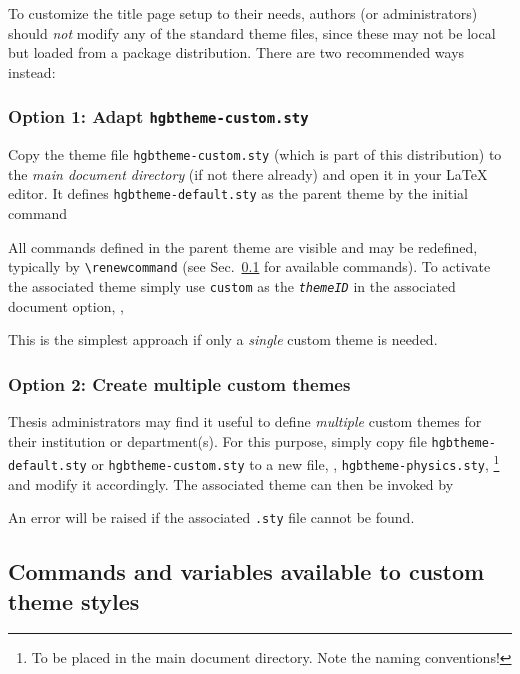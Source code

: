 \documentclass[english]{hgbarticle}
\begin{document}
To customize the title page setup to their needs, authors (or administrators) should 
\emph{not} modify any of the standard theme files, since these may not be local but loaded
from a package distribution.
There are two recommended ways instead:

\subsubsection{Option 1: Adapt \texttt{hgbtheme-custom.sty}}

Copy the theme file \texttt{hgbtheme-custom.sty} (which is part of this distribution) to the 
\emph{main document directory} (if not there already) and open it in your LaTeX editor.
It defines \texttt{hgbtheme-default.sty} as the parent theme by the initial command
\begin{LaTeXCode}[numbers=none]
\end{LaTeXCode}
%
All commands defined in the parent theme are visible and may be redefined,
typically by \verb!\renewcommand! (see Sec.\ \ref{sec:ThemeStyleCommands}
for available commands).
To activate the associated theme simply use \texttt{custom} as the \texttt{\textit{themeID}}
in the associated document option, \ie,
%
%
This is the simplest approach if only a \emph{single} custom theme is needed.

\subsubsection{Option 2: Create multiple custom themes}

Thesis administrators may find it useful to define \emph{multiple} custom themes for their
institution or department(s).
For this purpose, simply copy file \texttt{hgbtheme-default.sty} or \texttt{hgbtheme-custom.sty}
to a new file, \eg, \texttt{hgbtheme-physics.sty},%
\footnote{To be placed in the main document directory. Note the naming conventions!}
and modify it accordingly. The associated theme can then be invoked by
%
%
An error will be raised if the associated \texttt{.sty} file cannot be found.



\subsection{Commands and variables available to custom theme styles}
\label{sec:ThemeStyleCommands}
\end{document}
